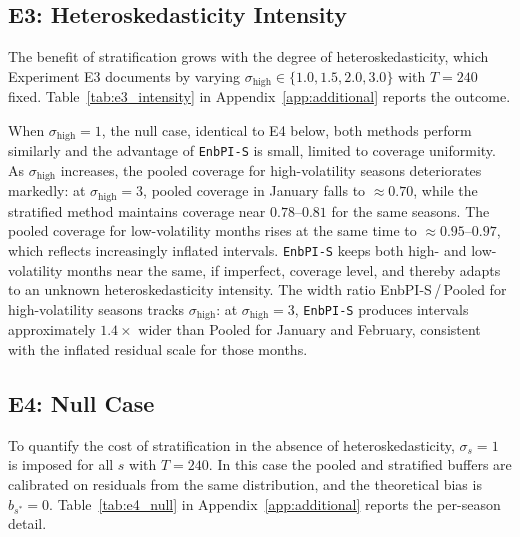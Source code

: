 \subsection{E3: Heteroskedasticity Intensity}
\label{sec:simulations:e3}

The benefit of stratification grows with the degree of
heteroskedasticity, which Experiment E3 documents by varying
$\sigma_{\mathrm{high}} \in \{1.0, 1.5, 2.0, 3.0\}$ with $T = 240$
fixed.  Table~\ref{tab:e3_intensity} in Appendix~\ref{app:additional}
reports the outcome.

When $\sigma_{\mathrm{high}} = 1$, the null case, identical to E4
below, both methods perform similarly and the advantage of
\texttt{EnbPI-S} is small, limited to coverage uniformity.
As $\sigma_{\mathrm{high}}$ increases, the pooled coverage for
high-volatility seasons deteriorates markedly: at
$\sigma_{\mathrm{high}} = 3$, pooled coverage in January falls to
$\approx 0.70$, while the stratified method maintains coverage near
$0.78$--$0.81$ for the same seasons.  The pooled coverage for
low-volatility months rises at the same time to
$\approx 0.95$--$0.97$, which reflects increasingly inflated
intervals.  \texttt{EnbPI-S} keeps both high- and low-volatility
months near the same, if imperfect, coverage level, and thereby
adapts to an unknown heteroskedasticity intensity.
The width ratio EnbPI-S\,/\,Pooled for high-volatility seasons
tracks $\sigma_{\mathrm{high}}$: at $\sigma_{\mathrm{high}} = 3$,
\texttt{EnbPI-S} produces intervals approximately $1.4\times$ wider
than Pooled for January and February, consistent with the inflated
residual scale for those months.

\subsection{E4: Null Case}
\label{sec:simulations:e4}

To quantify the cost of stratification in the absence of
heteroskedasticity, $\sigma_s = 1$ is imposed for all $s$ with
$T = 240$.  In this case the pooled and stratified buffers are
calibrated on residuals from the same distribution, and the
theoretical bias is $b_{s^*} = 0$.  Table~\ref{tab:e4_null} in
Appendix~\ref{app:additional} reports the per-season detail.

